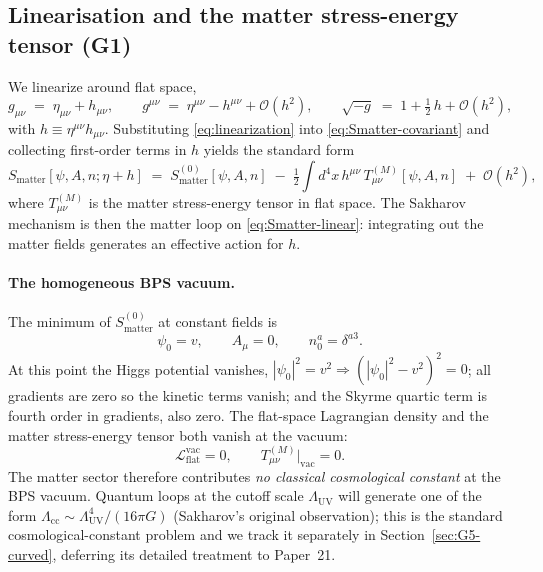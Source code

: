 \documentclass[11pt]{article}
\begin{document}
\subsection{Linearisation and the matter stress-energy tensor (G1)}
\label{sec:G1}

We linearize around flat space,
\begin{equation}
  g_{\mu\nu} \;=\; \eta_{\mu\nu} + h_{\mu\nu},
  \qquad
  g^{\mu\nu} \;=\; \eta^{\mu\nu} - h^{\mu\nu} + \mathcal{O}(h^2),
  \qquad
  \sqrt{-g} \;=\; 1 + \tfrac{1}{2}\,h + \mathcal{O}(h^2),
  \label{eq:linearization}
\end{equation}
with $h \equiv \eta^{\mu\nu} h_{\mu\nu}$.  Substituting
\eqref{eq:linearization} into \eqref{eq:Smatter-covariant} and
collecting first-order terms in $h$ yields the standard form
\begin{equation}
  S_{\mathrm{matter}}[\psi, A, n; \eta+h]
  \;=\;
  S_{\mathrm{matter}}^{(0)}[\psi, A, n]
  \;-\;
  \tfrac{1}{2}\int d^4 x\,h^{\mu\nu}\,T^{(M)}_{\mu\nu}[\psi, A, n]
  \;+\;\mathcal{O}(h^2),
  \label{eq:Smatter-linear}
\end{equation}
where $T^{(M)}_{\mu\nu}$ is the matter stress-energy tensor in
flat space.  The Sakharov mechanism is then the matter loop on
\eqref{eq:Smatter-linear}: integrating out the matter fields
generates an effective action for $h$.

\paragraph{The homogeneous BPS vacuum.}  The minimum of
$S_{\mathrm{matter}}^{(0)}$ at constant fields is
\begin{equation}
  \psi_0 = v,
  \qquad
  A_\mu = 0,
  \qquad
  n^a_0 = \delta^{a 3}.
  \label{eq:BPS-vacuum}
\end{equation}
At this point the Higgs potential vanishes,
$|\psi_0|^2 = v^2 \Rightarrow (|\psi_0|^2 - v^2)^2 = 0$; all
gradients are zero so the kinetic terms vanish; and the Skyrme
quartic term is fourth order in gradients, also zero.  The
flat-space Lagrangian density and the matter stress-energy tensor
both vanish at the vacuum:
\begin{equation}
  \mathcal{L}_{\mathrm{flat}}^{\mathrm{vac}} = 0,
  \qquad
  T^{(M)}_{\mu\nu}\big|_{\mathrm{vac}} = 0.
  \label{eq:vac-vanish}
\end{equation}
The matter sector therefore contributes \emph{no classical
cosmological constant} at the BPS vacuum.  Quantum loops at the
cutoff scale $\Lambda_{\mathrm{UV}}$ will generate one of the form
$\Lambda_{\mathrm{cc}} \sim \Lambda_{\mathrm{UV}}^4 / (16\pi G)$
(Sakharov's original observation); this is the standard
cosmological-constant problem and we track it separately in
Section~\ref{sec:G5-curved}, deferring its detailed treatment to
Paper~21.
\end{document}

